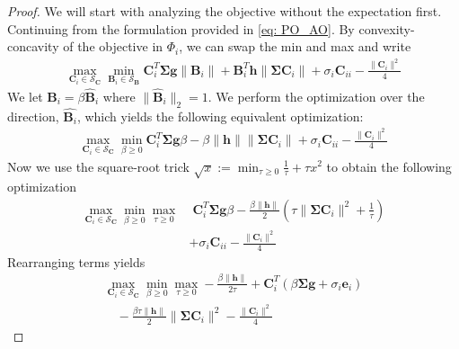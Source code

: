 \documentclass[10pt,a4paper]{amsart}
\newcommand{\bB}{\mathbf{B}}
\newcommand{\bC}{\mathbf{C}}
\newcommand{\calS}{\mathcal{S}}
\begin{document}
\begin{proof}
We will start with analyzing the objective without the expectation first. Continuing from the formulation provided in \eqref{eq: PO_AO}. By convexity-concavity of the objective in $\Phi_i$, we can swap the min and max and write
\begin{align*}
    \max_{\mathbf{C}_i \in \calS_{\bC}} \min_{\mathbf{B}_i \in \calS_{\bB}}  \mathbf{C}_i^T \boldsymbol{\Sigma} \mathbf{g} \|\mathbf{B}_i\| + \mathbf{B}_i^T \mathbf{h} \|\boldsymbol{\Sigma}\mathbf{C}_i\| + \sigma_i\mathbf{C}_{ii}- \frac{\|\mathbf{C}_i\|^2}{4}
\end{align*}
We let $\bB_i = \beta \hat{\bB}_i$ where $\|\hat{\bB}_i\|_2 = 1$. We perform the optimization over the direction, $\hat{\bB_i}$, which yields the following equivalent optimization:
\begin{align*}
     \max_{\mathbf{C}_i \in \calS_{\bC}} \min_{\beta \ge 0} \mathbf{C}_i^T \boldsymbol{\Sigma} \mathbf{g} \beta - \beta \|\mathbf{h}\| \|\boldsymbol{\Sigma}\mathbf{C}_i\| + \sigma_i\mathbf{C}_{ii}- \frac{\|\mathbf{C}_i\|^2}{4} 
\end{align*}
Now we use the square-root trick $\sqrt{x}:= \min_{\tau \ge 0} \frac{1}{\tau} + \tau x^2$ to obtain the following optimization
\begin{align*}
     \max_{\mathbf{C}_i \in \calS_{\bC}} \min_{\beta \ge 0} \max_{\tau \ge 0} & \;\mathbf{C}_i^T \boldsymbol{\Sigma} \mathbf{g} \beta - \frac{\beta  \|\mathbf{h}\|}{2} \left(\tau\|\boldsymbol{\Sigma}\mathbf{C}_i\|^2 + \frac{1}{\tau}\right) \\ &+ \sigma_i\mathbf{C}_{ii}- \frac{\|\mathbf{C}_i\|^2}{4}
\end{align*}
Rearranging terms yields
\begin{align}
    \max_{\mathbf{C}_i \in \calS_{\bC}}  \min_{\beta \ge 0} \max_{\tau \ge 0} - \frac{\beta\|\mathbf{h}\|}{2\tau} + \mathbf{C}_i^T \left(\beta \boldsymbol{\Sigma} \mathbf{g} + \sigma_i\mathbf{e}_i\right) \nonumber \\
    \quad - \frac{\beta\tau  \|\mathbf{h}\|}{2} \|\boldsymbol{\Sigma}\mathbf{C}_i\|^2 - \frac{\|\mathbf{C}_i\|^2}{4} \label{opt: scal_not}
\end{align}


\end{proof}
\end{document}
